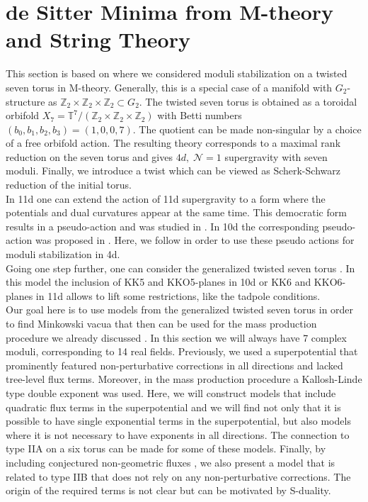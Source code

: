 \documentclass[a4paper,12pt]{report}
\begin{document}
\section{de Sitter Minima from M-theory and String Theory}
\label{sec:mtheory}
This section is based on \cite{Cribiori:2019hrb} where we considered moduli stabilization on a twisted seven torus in M-theory. Generally, this is a special case of a manifold with $G_2$-structure as $\mathbb{Z}_2 \times \mathbb{Z}_2 \times \mathbb{Z}_2 \subset G_2$. The twisted seven torus is obtained as a toroidal orbifold $X_7 = \mathbb{T}^7/(\mathbb{Z}_2 \times \mathbb{Z}_2 \times \mathbb{Z}_2)$ \cite{DallAgata:2005zlf,Duff:2010vy,Derendinger:2014wwa,Ferrara:2016fwe} with Betti numbers $(b_0,b_1,b_2,b_3) = (1,0,0,7)$. The quotient can be made non-singular by a choice of a free orbifold action. The resulting theory corresponds to a maximal rank reduction on the seven torus and gives $4d, \; \mathcal{N}=1$ supergravity with seven moduli. Finally, we introduce a twist which can be viewed as Scherk-Schwarz reduction \cite{Scherk:1978ta,Scherk:1979zr,Mueller-Hoissen:1987cwl,DallAgata:2005zlf,Grana:2013ila} of the initial torus.\\
In 11d one can extend the action of 11d supergravity to a form where the potentials and dual curvatures appear at the same time. This democratic form results in a pseudo-action and was studied in \cite{DallAgata:2005zlf}. In 10d the corresponding pseudo-action was proposed in \cite{Bergshoeff:2001pv}. Here, we follow \cite{DallAgata:2005zlf,Derendinger:2014wwa} in order to use these pseudo actions for moduli stabilization in 4d.\\
Going one step further, one can consider the generalized twisted seven torus \cite{Derendinger:2014wwa,Blaback:2018hdo,Villadoro:2007yq}. In this model the inclusion of KK5 and KKO5-planes in 10d or KK6 and KKO6-planes in 11d allows to lift some restrictions, like the tadpole conditions.\\
Our goal here is to use models from the generalized twisted seven torus in order to find Minkowski vacua that then can be used for the mass production procedure we already discussed \cite{Kallosh:2019zgd,Cribiori:2019drf}. In this section we will always have 7 complex moduli, corresponding to 14 real fields. Previously, we used a superpotential that prominently featured non-perturbative corrections in all directions and lacked tree-level flux terms. Moreover, in the mass production procedure a Kallosh-Linde type double exponent was used. Here, we will construct models that include quadratic flux terms in the superpotential and we will find not only that it is possible to have single exponential terms in the superpotential, but also models where it is not necessary to have exponents in all directions. The connection to type IIA on a six torus can be made for some of these models. Finally, by including conjectured non-geometric fluxes \cite{Aldazabal:2006up}, we also present a model that is related to type IIB that does not rely on any non-perturbative corrections. The origin of the required terms is not clear but can be motivated by S-duality.
\end{document}
